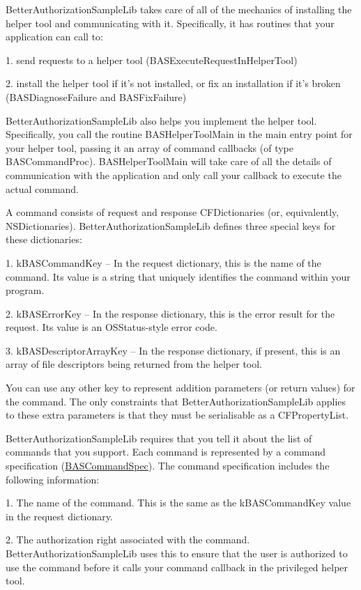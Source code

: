 BetterAuthorizationSampleLib takes care of all of the mechanics of installing the helper tool and communicating with it. Specifically, it has routines that your application can call to:

1. send requests to a helper tool (BASExecuteRequestInHelperTool)

2. install the helper tool if it's not installed, or fix an installation if it's broken (BASDiagnoseFailure and BASFixFailure)

BetterAuthorizationSampleLib also helps you implement the helper tool. Specifically, you call the routine BASHelperToolMain in the main entry point for your helper tool, passing it an array of command callbacks (of type BASCommandProc). BASHelperToolMain will take care of all the details of communication with the application and only call your callback to execute the actual command.

A command consists of request and response CFDictionaries (or, equivalently, NSDictionaries). BetterAuthorizationSampleLib defines three special keys for these dictionaries:

1. kBASCommandKey -- In the request dictionary, this is the name of the command. Its value is a string that uniquely identifies the command within your program.

2. kBASErrorKey -- In the response dictionary, this is the error result for the request. Its value is an OSStatus-style error code.

3. kBASDescriptorArrayKey -- In the response dictionary, if present, this is an array of file descriptors being returned from the helper tool.

You can use any other key to represent addition parameters (or return values) for the command. The only constraints that BetterAuthorizationSampleLib applies to these extra parameters is that they must be serialisable as a CFPropertyList.

BetterAuthorizationSampleLib requires that you tell it about the list of commands that you support. Each command is represented by a command specification (\hyperlink{struct_b_a_s_command_spec}{BASCommandSpec}). The command specification includes the following information:

1. The name of the command. This is the same as the kBASCommandKey value in the request dictionary.

2. The authorization right associated with the command. BetterAuthorizationSampleLib uses this to ensure that the user is authorized to use the command before it calls your command callback in the privileged helper tool.

